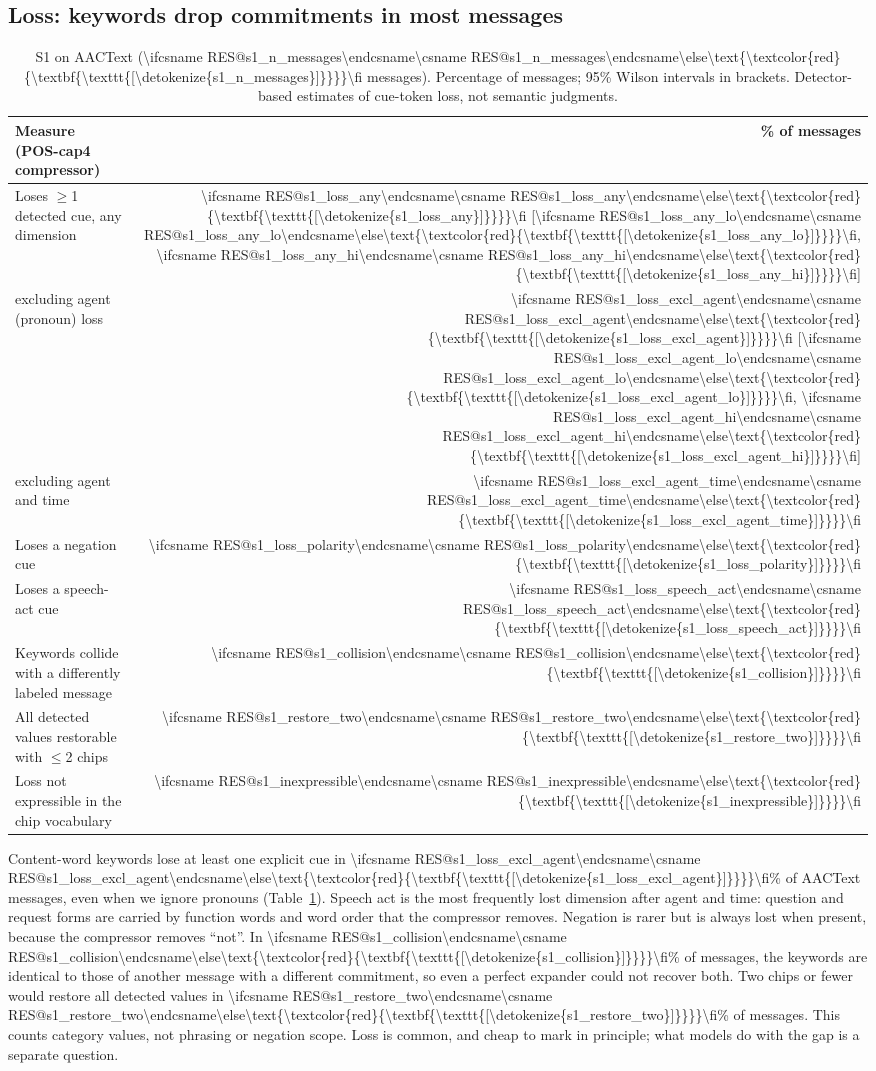 \documentclass{ceurart}
\makeatletter
\newcommand{\RES}[1]{\ifcsname RES@#1\endcsname\csname RES@#1\endcsname\else\RESmissing{#1}\fi}
\newcommand{\RESmissing}[1]{\text{\textcolor{red}{\textbf{\texttt{[\detokenize{#1}]}}}}}
\newcommand{\ci}[1]{[\num{\RES{#1_lo}}, \num{\RES{#1_hi}}]}
\newcommand{\say}[1]{``#1''}
\makeatother
\begin{document}
\subsection{Loss: keywords drop commitments in most messages}
\begin{table}[t]
  \caption{S1 on AACText (\num{\RES{s1_n_messages}} messages). Percentage of messages; 95\% Wilson intervals in brackets. Detector-based estimates of cue-token loss, not semantic judgments.}
  \label{tab:s1}
  \small
  \begin{tabular}{@{}lr@{}}
    \toprule
    Measure (POS-cap4 compressor) & \% of messages\\
    \midrule
    Loses $\geq$1 detected cue, any dimension & \num{\RES{s1_loss_any}} \ci{s1_loss_any}\\
    \quad excluding agent (pronoun) loss & \num{\RES{s1_loss_excl_agent}} \ci{s1_loss_excl_agent}\\
    \quad excluding agent and time & \num{\RES{s1_loss_excl_agent_time}}\\
    Loses a negation cue & \num{\RES{s1_loss_polarity}}\\
    Loses a speech-act cue & \num{\RES{s1_loss_speech_act}}\\
    Keywords collide with a differently labeled message & \num{\RES{s1_collision}}\\
    All detected values restorable with $\leq$2 chips & \num{\RES{s1_restore_two}}\\
    Loss not expressible in the chip vocabulary & \num{\RES{s1_inexpressible}}\\
    \bottomrule
  \end{tabular}
\end{table}
Content-word keywords lose at least one explicit cue in \num{\RES{s1_loss_excl_agent}}\% of AACText messages, even when we ignore pronouns (Table~\ref{tab:s1}). %
Speech act is the most frequently lost dimension after agent and time: question and request forms are carried by function words and word order that the compressor removes. %
Negation is rarer but is always lost when present, because the compressor removes \say{not}. %
In \num{\RES{s1_collision}}\% of messages, the keywords are identical to those of another message with a different commitment, so even a perfect expander could not recover both. %
Two chips or fewer would restore all detected values in \num{\RES{s1_restore_two}}\% of messages. %
This counts category values, not phrasing or negation scope. Loss is common, and cheap to mark in principle; what models do with the gap is a separate question.
\end{document}
